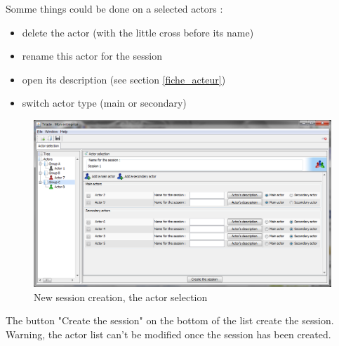 Somme things could be done on a selected actors : \\
\begin{itemize}
\item delete the actor (with the little cross before its name)
\item rename this actor for the session
\item open its description (see section \ref{fiche_acteur})
\item switch actor type (main or secondary)\\
\end{itemize}



\begin{figure}[h!t]
\centering
\includegraphics[scale=0.35]{images/selection_acteurs.png}

\caption{New session creation, the actor selection}

\end{figure}
The button "Create the session" on the bottom of the list create the session. Warning, the actor list can't be modified once the session has been created.\\


